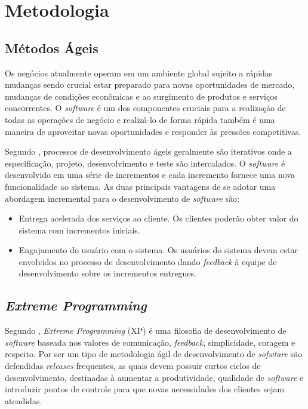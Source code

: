\chapter{Metodologia}

\section{Métodos Ágeis}
Os negócios atualmente operam em um ambiente global sujeito a rápidas mudanças sendo crucial
estar preparado para novas oportunidades de mercado, mudanças de condições econômicas e ao surgimento
de produtos e serviços concorrentes. O \textit{software} é um dos componentes cruciais para a realização
de todas as operações de negócio e realizá-lo de forma rápida também é uma maneira de aproveitar novas
oportunidades e responder às pressões competitivas. \cite{sommerville_2006}

Segundo \cite{sommerville_2006}, processos de desenvolvimento ágeis geralmente são iterativos onde a
especificação, projeto, desenvolvimento e teste são intercalados. O \textit{software} é desenvolvido
em uma série de incrementos e cada incremento fornece uma nova funcionalidade ao sistema. As duas principais
vantagens de se adotar uma abordagem incremental para o desenvolvimento de \textit{software} são:

\begin{itemize}
    \item Entrega acelerada dos serviços ao cliente. Os clientes poderão obter valor do sistema com incrementos iniciais.
    \item Engajamento do usuário com o sistema. Os usuários do sistema devem estar envolvidos no processo
    de desenvolvimento dando \textit{feedback} à equipe de desenvolvimento sobre os incrementos entregues.
\end{itemize}

\section{\textit{Extreme Programming}}
Segundo \cite{beck_2004}, \textit{Extreme Programming} (XP) é uma filosofia de desenvolvimento de
\textit{software} baseada nos valores de comunicação, \textit{feedback}, simplicidade, coragem e respeito.
Por ser um tipo de metodologia ágil de desenvolvimento de \textit{sofwtare} são defendidas \textit{releases}
frequentes, as quais devem possuir curtos ciclos de desenvolvimento, destinadas à aumentar a produtividade, qualidade de \textit{software} e introduzir pontos de controle para que novas necessidades dos clientes sejam atendidas.


